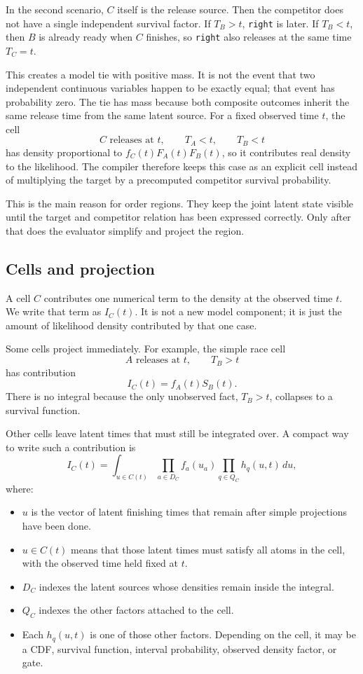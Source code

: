 \documentclass[11pt]{article}
\begin{document}
In the second scenario, $C$ itself is the release source. Then the competitor
does not have a single independent survival factor. If $T_B > t$,
\texttt{right} is later. If $T_B < t$, then $B$ is already ready when $C$
finishes, so \texttt{right} also releases at the same time $T_C=t$.

This creates a model tie with positive mass. It is not the event that two
independent continuous variables happen to be exactly equal; that event has
probability zero. The tie has mass because both composite outcomes inherit the
same release time from the same latent source. For a fixed observed time $t$,
the cell
\[
\text{$C$ releases at $t$}, \qquad T_A < t, \qquad T_B < t
\]
has density proportional to $f_C(t)F_A(t)F_B(t)$, so it contributes real density
to the likelihood. The compiler therefore keeps this case as an explicit cell
instead of multiplying the target by a precomputed competitor survival
probability.

This is the main reason for order regions. They keep the joint latent state
visible until the target and competitor relation has been expressed correctly.
Only after that does the evaluator simplify and project the region.

\subsection{Cells and projection}

A cell $C$ contributes one numerical term to the density at the observed time
$t$. We write that term as $I_C(t)$. It is not a new model component; it is just
the amount of likelihood density contributed by that one case.

Some cells project immediately. For example, the simple race cell
\[
\text{$A$ releases at $t$}, \qquad T_B > t
\]
has contribution
\[
I_C(t) = f_A(t)S_B(t).
\]
There is no integral because the only unobserved fact, $T_B>t$, collapses to a
survival function.

Other cells leave latent times that must still be integrated over. A compact
way to write such a contribution is
\[
I_C(t)
=
\int_{u \in C(t)}
\prod_{a \in D_C} f_a(u_a)
\prod_{q \in Q_C} h_q(u,t)
\,du,
\]
where:

\begin{itemize}
  \item $u$ is the vector of latent finishing times that remain after simple
  projections have been done.
  \item $u \in C(t)$ means that those latent times must satisfy all atoms in
  the cell, with the observed time held fixed at $t$.
  \item $D_C$ indexes the latent sources whose densities remain inside the
  integral.
  \item $Q_C$ indexes the other factors attached to the cell.
  \item Each $h_q(u,t)$ is one of those other factors. Depending on the cell, it
  may be a CDF, survival function, interval probability, observed density
  factor, or gate.
\end{itemize}
\end{document}
